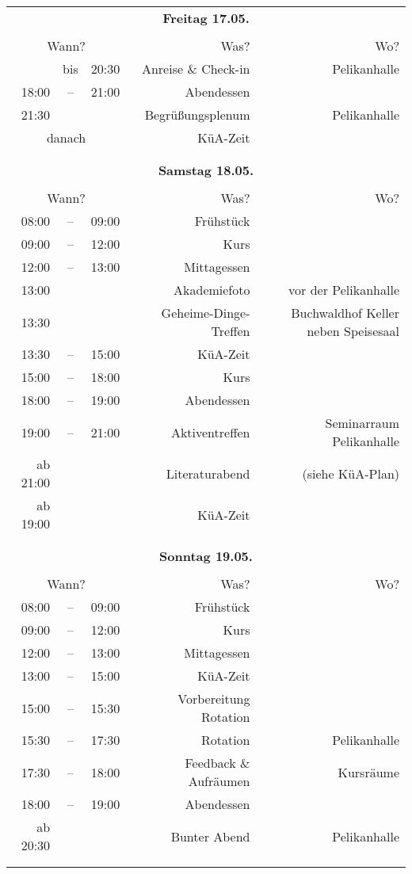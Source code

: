 \documentclass{scrartcl}
\begin{document}
\pagestyle{empty}

\vspace{1cm}

\begin{tabular}{rcrrr}
\multicolumn{5}{c}{\textbf{\huge{Freitag 17.05.}}}\\
\\
\multicolumn{3}{c}{Wann?} & Was? & Wo?  \\
\hline
& bis & 20:30 & Anreise \& Check-in & Pelikanhalle\\
18:00&--&21:00& Abendessen & \\
21:30 &&& Begrüßungsplenum & Pelikanhalle\\
\multicolumn{3}{c}{danach}& KüA-Zeit &\\
\\
\\

\multicolumn{5}{c}{\textbf{\huge{Samstag 18.05.}}}\\
\\
\multicolumn{3}{c}{Wann?} & Was? & Wo? \\
\hline
08:00&--&09:00 & Frühstück \\ 
09:00&--&12:00 & Kurs       \\ 
12:00&--&13:00 & Mittagessen \\
13:00&&& Akademiefoto & vor der Pelikanhalle\\
13:30&&& Geheime-Dinge-Treffen & Buchwaldhof Keller neben Speisesaal\\
13:30&--&15:00 & KüA-Zeit \\
15:00&--&18:00 & Kurs \\
18:00&--&19:00 & Abendessen \\
19:00&--&21:00& Aktiventreffen & Seminarraum Pelikanhalle \\
ab 21:00&&& Literaturabend & (siehe KüA-Plan)\\
ab 19:00&& & KüA-Zeit \\

\\
\\
\multicolumn{5}{c}{\textbf{\huge{Sonntag 19.05.}}}\\
\\
\multicolumn{3}{c}{Wann?} & Was?  & Wo? \\
\hline
08:00&--&09:00 & Frühstück \\ 
09:00&--&12:00 & Kurs       \\ 
12:00&--&13:00 & Mittagessen \\
13:00&--&15:00 & KüA-Zeit \\
15:00&--&15:30 & Vorbereitung Rotation \\
15:30&--&17:30 & Rotation  & Pelikanhalle\\
17:30&--&18:00 & Feedback \& Aufräumen & Kursräume \\
18:00&--&19:00 & Abendessen \\
ab 20:30&&  & Bunter Abend & Pelikanhalle\\
\\
\\


\end{tabular}
\end{document}
